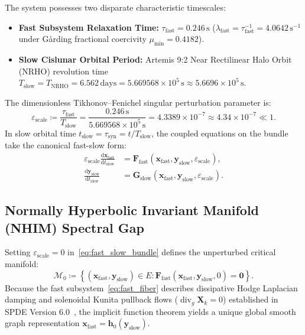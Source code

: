 \documentclass[11pt,a4paper,reqno]{article}
\theoremstyle{plain}
\theoremstyle{definition}
\theoremstyle{remark}
\numberwithin{equation}{section}
\begin{document}
The system possesses two disparate characteristic timescales:
\begin{itemize}
  \item \textbf{Fast Subsystem Relaxation Time:} $\tau_{\mathrm{fast}} = 0.246\,\mathrm{s}$ ($\lambda_{\mathrm{fast}} = \tau_{\mathrm{fast}}^{-1} = 4.0642\,\mathrm{s}^{-1}$ under G\r{a}rding fractional coercivity $\mu_{\min} = 0.4182$).
  \item \textbf{Slow Cislunar Orbital Period:} Artemis 9:2 Near Rectilinear Halo Orbit (NRHO) revolution time $T_{\mathrm{slow}} = T_{\mathrm{NRHO}} = 6.562\,\mathrm{days} = 5.669568 \times 10^5\,\mathrm{s} \approx 5.6696 \times 10^5\,\mathrm{s}$.
\end{itemize}
The dimensionless Tikhonov--Fenichel singular perturbation parameter is:
\begin{equation}
  \varepsilon_{\mathrm{scale}} \coloneqq \frac{\tau_{\mathrm{fast}}}{T_{\mathrm{slow}}} = \frac{0.246\,\mathrm{s}}{5.669568 \times 10^5\,\mathrm{s}} = 4.3389 \times 10^{-7} \approx 4.34 \times 10^{-7} \ll 1.
  \label{eq:singular_perturbation_parameter}
\end{equation}
In slow orbital time $t_{\mathrm{slow}} = \tau_{\mathrm{syn}} = t / T_{\mathrm{slow}}$, the coupled equations on the bundle take the canonical fast-slow form:
\begin{subequations}
\label{eq:fast_slow_bundle}
\begin{align}
  \varepsilon_{\mathrm{scale}} \frac{\mathrm{d} \bm{x}_{\mathrm{fast}}}{\mathrm{d} t_{\mathrm{slow}}} &= \bm{F}_{\mathrm{fast}}(\bm{x}_{\mathrm{fast}}, \bm{y}_{\mathrm{slow}}, \varepsilon_{\mathrm{scale}}), \label{eq:fast_fiber} \\
  \frac{\mathrm{d} \bm{y}_{\mathrm{slow}}}{\mathrm{d} t_{\mathrm{slow}}} &= \bm{G}_{\mathrm{slow}}(\bm{x}_{\mathrm{fast}}, \bm{y}_{\mathrm{slow}}, \varepsilon_{\mathrm{scale}}). \label{eq:slow_base}
\end{align}
\end{subequations}

\subsection{Normally Hyperbolic Invariant Manifold (NHIM) Spectral Gap}
Setting $\varepsilon_{\mathrm{scale}} = 0$ in~\eqref{eq:fast_slow_bundle} defines the unperturbed critical manifold:
\begin{equation}
  \mathcal{M}_0 \coloneqq \left\{ (\bm{x}_{\mathrm{fast}}, \bm{y}_{\mathrm{slow}}) \in E : \bm{F}_{\mathrm{fast}}(\bm{x}_{\mathrm{fast}}, \bm{y}_{\mathrm{slow}}, 0) = \bm{0} \right\}.
\end{equation}
Because the fast subsystem~\eqref{eq:fast_fiber} describes dissipative Hodge Laplacian damping and solenoidal Kunita pullback flows ($\operatorname{div}_g \bm{X}_k = 0$) established in SPDE Version 6.0~\cite{SPDEV60}, the implicit function theorem yields a unique global smooth graph representation $\bm{x}_{\mathrm{fast}} = \bm{h}_0(\bm{y}_{\mathrm{slow}})$.
\end{document}
